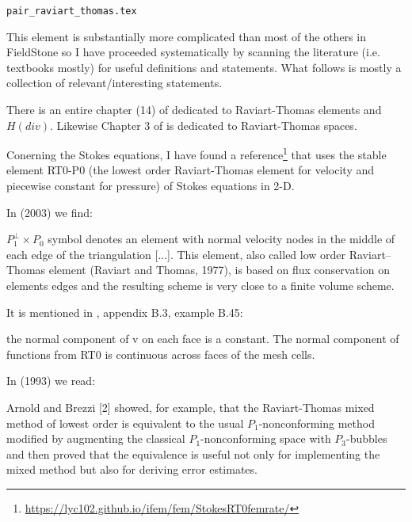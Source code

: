 \begin{flushright} {\tiny {\color{gray} \tt pair\_raviart\_thomas.tex}} \end{flushright}

This element is substantially more complicated than most of the others
in FieldStone so I have proceeded systematically by 
scanning the literature (i.e. textbooks mostly) for 
useful definitions and statements. What follows is mostly a collection
of relevant/interesting statements.  


There is an entire chapter (14) of \textcite{ergu21_72} dedicated to 
Raviart-Thomas elements and $H(div)$.
Likewise Chapter 3 of \textcite{gatica} is dedicated to Raviart-Thomas spaces.

Conerning the Stokes equations, 
I have found a reference\footnote{\url{https://lyc102.github.io/ifem/fem/StokesRT0femrate/}}
that uses the stable element RT0-P0 (the lowest order Raviart-Thomas element for velocity 
and piecewise constant for pressure) of Stokes equations in 2-D.


 
In \textcite{hald03} (2003) we find: 
\begin{displayquote}
{\color{darkgray}
$P_1^\perp \times P_0$ symbol denotes an element with 
normal velocity nodes in the middle of each edge of the
triangulation [...]. This element, also called low order Raviart–Thomas element 
(Raviart and Thomas, 1977), is based on flux conservation on elements edges and 
the resulting scheme is very close to a finite volume scheme.
}
\end{displayquote}

It is mentioned in \textcite{john16}, appendix B.3, example B.45: 
\begin{displayquote}
{\color{darkgray}
the normal component of v 
on each face is a constant. The normal component of functions from RT0 is
continuous across faces of the mesh cells.
}
\end{displayquote}


In \textcite{chen93a} (1993) we read:
\begin{displayquote}
{\color{darkgray}
Arnold and Brezzi [2] showed, for
example, that the Raviart-Thomas mixed method of lowest order is
equivalent to the usual $P_1$-nonconforming method modified by augmenting
the classical $P_1$-nonconforming space with $P_3$-bubbles and then proved that
the equivalence is useful not only for implementing the mixed method but
also for deriving error estimates.
}
\end{displayquote}


